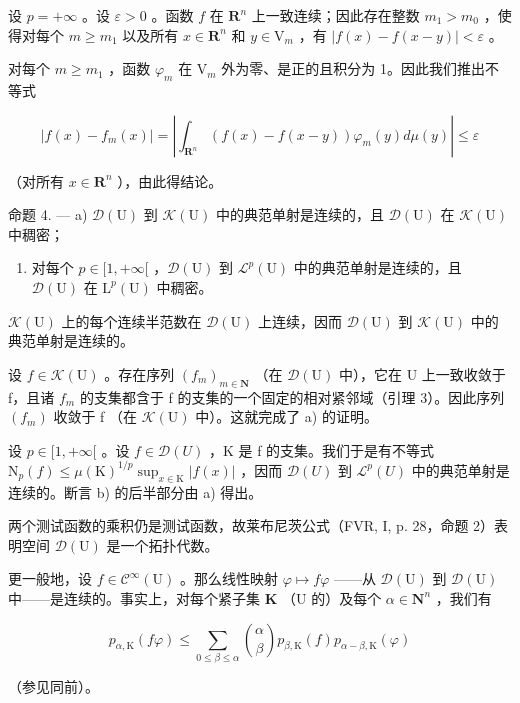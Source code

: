 设 \(p = +\infty\) 。设 \(\varepsilon > 0\) 。函数 \(f\) 在 \(\mathbf{R}^n\) 上一致连续；因此存在整数 \(m_1 > m_0\) ，使得对每个 \(m \geqslant m_1\) 以及所有 \(x \in \mathbf{R}^n\) 和 \(y \in \mathrm{V}_m\) ，有 \(|f(x) - f(x - y)| < \varepsilon\) 。

对每个 \(m \geqslant m_{1}\) ，函数 \(\varphi_{m}\) 在 \(\mathrm{V}_{m}\) 外为零、是正的且积分为 1。因此我们推出不等式

\[
| f (x) - f _ {m} (x) | = \left| \int_ {\mathbf {R} ^ {n}} (f (x) - f (x - y)) \varphi_ {m} (y) d \mu (y) \right| \leqslant \varepsilon
\]

（对所有 \(x \in \mathbf{R}^{n}\) ），由此得结论。

命题 4. --- a) \(\mathcal{D}(\mathrm{U})\) 到 \(\mathcal{K}(\mathrm{U})\) 中的典范单射是连续的，且 \(\mathcal{D}(\mathrm{U})\) 在 \(\mathcal{K}(\mathrm{U})\) 中稠密；

\begin{enumerate}
\def\labelenumi{\alph{enumi})}
\setcounter{enumi}{1}
\tightlist
\item
  对每个 \(p \in [1, +\infty[\) ，\(\mathcal{D}(\mathrm{U})\) 到 \(\mathcal{L}^p(\mathrm{U})\) 中的典范单射是连续的，且 \(\mathcal{D}(\mathrm{U})\) 在 \(\mathrm{L}^p(\mathrm{U})\) 中稠密。
\end{enumerate}

\(\mathcal{K}(\mathrm{U})\) 上的每个连续半范数在 \(\mathcal{D}(\mathrm{U})\) 上连续，因而 \(\mathcal{D}(\mathrm{U})\) 到 \(\mathcal{K}(\mathrm{U})\) 中的典范单射是连续的。

设 \(f \in \mathcal{K}(\mathrm{U})\) 。存在序列 \((f_{m})_{m \in \mathbf{N}}\) （在 \(\mathcal{D}(\mathrm{U})\) 中），它在 U 上一致收敛于 f，且诸 \(f_{m}\) 的支集都含于 f 的支集的一个固定的相对紧邻域（引理 3）。因此序列 \((f_{m})\) 收敛于 f （在 \(\mathcal{K}(\mathrm{U})\) 中）。这就完成了 a) 的证明。

设 \(p \in [1, +\infty[\) 。设 \(f \in \mathcal{D}(U)\) ，K 是 f 的支集。我们于是有不等式 \(\mathrm{N}_{p}(f) \leqslant \mu(\mathrm{K})^{1/p} \sup_{x \in \mathrm{K}} |f(x)|\) ，因而 \(\mathcal{D}(U)\) 到 \(\mathcal{L}^{p}(U)\) 中的典范单射是连续的。断言 b) 的后半部分由 a) 得出。

两个测试函数的乘积仍是测试函数，故莱布尼茨公式（FVR, I, p. 28，命题 2）表明空间 \(\mathcal{D}(\mathrm{U})\) 是一个拓扑代数。

更一般地，设 \(f \in \mathcal{C}^{\infty}(\mathrm{U})\) 。那么线性映射 \(\varphi \mapsto f\varphi\) ——从 \(\mathcal{D}(\mathrm{U})\) 到 \(\mathcal{D}(\mathrm{U})\) 中——是连续的。事实上，对每个紧子集 \(\mathbf{K}\) （\(\mathrm{U}\) 的）及每个 \(\alpha \in \mathbf{N}^{n}\) ，我们有

\[
p _ {\alpha , \mathrm{K}} (f \varphi) \leqslant \sum_ {0 \leqslant \beta \leqslant \alpha} \binom {\alpha} {\beta} p _ {\beta , \mathrm{K}} (f) p _ {\alpha - \beta , \mathrm{K}} (\varphi)
\]

（参见同前）。

